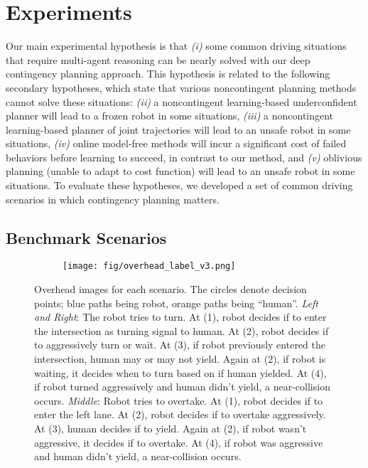 \documentclass[conference]{IEEEtran}
\begin{document}
\section{Experiments} \label{sec:experiments}
\vspace{-.25em}
Our main experimental hypothesis is that \emph{(i)} some common driving situations that require multi-agent reasoning can be nearly solved with our deep contingency planning approach. This hypothesis is related to the following secondary hypotheses, which state that various noncontingent planning methods cannot solve these situations: \emph{(ii)} a noncontingent learning-based underconfident planner will lead to a frozen robot in some situations, \emph{(iii)} a noncontingent learning-based planner of joint trajectories will lead to an unsafe robot in some situations, \emph{(iv)} online model-free methods will incur a significant cost of failed behaviors before learning to succeed, in contrast to our method, and \emph{(v)} oblivious planning (unable to adapt to cost function) will lead to an unsafe robot in some situations. To evaluate these hypotheses, we developed a set of common driving scenarios in which contingency planning matters.
\vspace{-.5em}
\subsection{Benchmark Scenarios}
\vspace{-.25em}
\begin{figure}[htb]
    \centering
    \begin{subfigure}[t]{\linewidth}
    \texttt{[image: fig/overhead\_label\_v3.png]}
    \end{subfigure}
        \caption{\small Overhead images for each scenario. The circles denote decision points; blue paths being robot, orange paths being ``human''. \emph{Left and Right}: The robot tries to turn. At (1), robot decides if to enter the intersection as turning signal to human. At (2), robot decides if to aggressively turn or wait.  At (3), if robot previously entered the intersection, human may or may not yield. Again at (2), if robot is waiting, it decides when to turn based on if human yielded. At (4), if robot turned aggressively and human didn’t yield, a near-collision occurs. \emph{Middle}: Robot tries to overtake. At (1), robot decides if to enter the left lane. At (2), robot decides if to overtake aggressively. At (3), human decides if to yield. Again at (2), if robot wasn't aggressive, it decides if to overtake. At (4), if robot was aggressive and human didn’t yield, a near-collision occurs.}\label{fig:task_images} 
        \vspace{-1.75em}
\end{figure}
\end{document}
